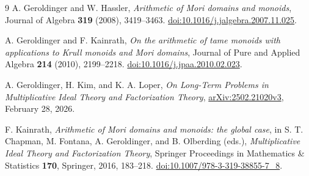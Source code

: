 \documentclass[11pt]{article}
\theoremstyle{definition}
\begin{document}
\begin{thebibliography}{9}
A. Geroldinger and W. Hassler,
\emph{Arithmetic of Mori domains and monoids},
Journal of Algebra \textbf{319} (2008), 3419--3463.
\href{https://doi.org/10.1016/j.jalgebra.2007.11.025}{doi:10.1016/j.jalgebra.2007.11.025}.

A. Geroldinger and F. Kainrath,
\emph{On the arithmetic of tame monoids with applications to Krull monoids and Mori domains},
Journal of Pure and Applied Algebra \textbf{214} (2010), 2199--2218.
\href{https://doi.org/10.1016/j.jpaa.2010.02.023}{doi:10.1016/j.jpaa.2010.02.023}.

A. Geroldinger, H. Kim, and K. A. Loper,
\emph{On Long-Term Problems in Multiplicative Ideal Theory and Factorization Theory},
\href{https://arxiv.org/abs/2502.21020}{arXiv:2502.21020v3}, February 28, 2026.

F. Kainrath,
\emph{Arithmetic of Mori domains and monoids: the global case},
in S. T. Chapman, M. Fontana, A. Geroldinger, and B. Olberding (eds.),
\emph{Multiplicative Ideal Theory and Factorization Theory},
Springer Proceedings in Mathematics \& Statistics \textbf{170}, Springer, 2016, 183--218.
\href{https://doi.org/10.1007/978-3-319-38855-7_8}{doi:10.1007/978-3-319-38855-7\_8}.
\end{thebibliography}
\end{document}
